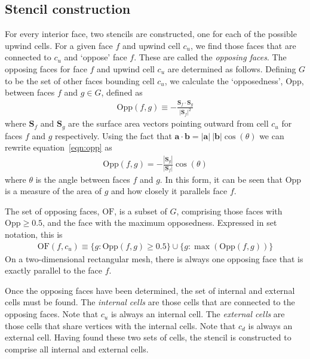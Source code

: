 \subsection{Stencil construction}
For every interior face, two stencils are constructed, one for each of the possible upwind cells.  For a given face $f$ and upwind cell $c_u$, we find those faces that are connected to $c_u$ and `oppose' face $f$.  These are called the \textit{opposing faces}.
The opposing faces for face $f$ and upwind cell $c_u$ are determined as follows.
Defining $G$ to be the set of other faces bounding cell $c_u$, we calculate the `opposedness', $\mathrm{Opp}$, between faces $f$ and $g \in G$, defined as
\begin{align}
	\mathrm{Opp}(f, g) \equiv - \frac{\mathbf{S}_f \cdot \mathbf{S}_g}{|\mathbf{S}_f|^2} \label{eqn:opp}
\end{align}
where $\mathbf{S}_f$ and $\mathbf{S}_g$ are the surface area vectors pointing outward from cell $c_u$ for faces $f$ and $g$ respectively.
Using the fact that $\mathbf{a} \cdot \mathbf{b} = |\mathbf{a}|\:|\mathbf{b}| \cos(\theta)$ we can rewrite equation~\eqref{eqn:opp} as
\begin{align}
	\mathrm{Opp}(f, g) = - \frac{|\mathbf{S}_g|}{|\mathbf{S}_f|} \cos(\theta)
\end{align}
where $\theta$ is the angle between faces $f$ and $g$.  In this form, it can be seen that $\mathrm{Opp}$ is a measure of the area of $g$ and how closely it parallels face $f$.

The set of opposing faces, $\mathrm{OF}$, is a subset of $G$, comprising those faces with $\mathrm{Opp} \geq 0.5$, and the face with the maximum opposedness.  Expressed in set notation, this is
\begin{align}
	\mathrm{OF}(f,c_u) \equiv \{ g : \mathrm{Opp}(f, g) \geq 0.5 \} \cup \{ g : \max(\mathrm{Opp}(f, g)) \} 
\end{align}
On a two-dimensional rectangular mesh, there is always one opposing face that is exactly parallel to the face $f$.

Once the opposing faces have been determined, the set of internal and external cells must be found.  The \textit{internal cells} are those cells that are connected to the opposing faces.  Note that $c_u$ is always an internal cell.  The \textit{external cells} are those cells that share vertices with the internal cells.  Note that $c_d$ is always an external cell.  Having found these two sets of cells, the stencil is constructed to comprise all internal and external cells.

